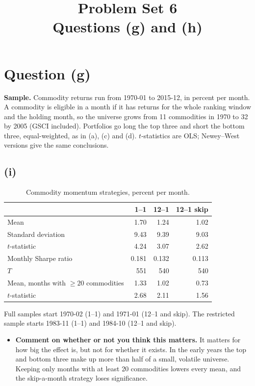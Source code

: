 \documentclass[11pt]{article}
\title{Problem Set 6\\[2pt]\large Questions (g) and (h)}
\author{}
\date{}
\begin{document}
\maketitle
\vspace{-2.5em}
\section*{Question (g)}

\textbf{Sample.} Commodity returns run from 1970-01 to 2015-12, in percent per month. A commodity is eligible in a month if it has returns for the whole ranking window and the holding month, so the universe grows from 11 commodities in 1970 to 32 by 2005 (GSCI included). Portfolios go long the top three and short the bottom three, equal-weighted, as in (a), (c) and (d). $t$-statistics are OLS; Newey--West versions give the same conclusions.

\subsection*{(i)}

\begin{table}[H]
\centering
\caption{Commodity momentum strategies, percent per month.}
\small
\begin{tabular}{lrrr}
\toprule
& 1--1 & 12--1 & 12--1 skip \\
\midrule
Mean & 1.70 & 1.24 & 1.02 \\
Standard deviation & 9.43 & 9.39 & 9.03 \\
$t$-statistic & 4.24 & 3.07 & 2.62 \\
Monthly Sharpe ratio & 0.181 & 0.132 & 0.113 \\
$T$ & 551 & 540 & 540 \\
\midrule
Mean, months with $\geq 20$ commodities & 1.33 & 1.02 & 0.73 \\
\quad $t$-statistic & 2.68 & 2.11 & 1.56 \\
\bottomrule
\end{tabular}
\vspace{2pt}\begin{minipage}{0.75\textwidth}\footnotesize
Full samples start 1970-02 (1--1) and 1971-01 (12--1 and skip). The restricted sample starts 1983-11 (1--1) and 1984-10 (12--1 and skip).
\end{minipage}
\end{table}

\begin{itemize}
\setlength{\itemsep}{4pt}\setlength{\parskip}{0pt}

\item \textbf{Comment on whether or not you think this matters.} It matters for how big the effect is, but not for whether it exists. In the early years the top and bottom three make up more than half of a small, volatile universe. Keeping only months with at least 20 commodities lowers every mean, and the skip-a-month strategy loses significance.

\end{itemize}
\end{document}
